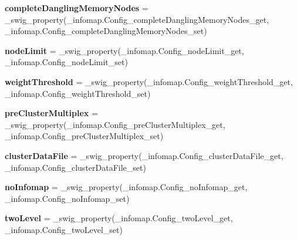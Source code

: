 \begin{DoxyCompactItemize}
\item 
\mbox{\label{classinfomap_1_1Config_a32dbd662fbf0eb3303bb3212ff23edd2}} 
{\bfseries complete\+Dangling\+Memory\+Nodes} = \+\_\+swig\+\_\+property(\+\_\+infomap.\+Config\+\_\+complete\+Dangling\+Memory\+Nodes\+\_\+get, \+\_\+infomap.\+Config\+\_\+complete\+Dangling\+Memory\+Nodes\+\_\+set)
\item 
\mbox{\label{classinfomap_1_1Config_acb667efe63380c616ba19148dff6f3b7}} 
{\bfseries node\+Limit} = \+\_\+swig\+\_\+property(\+\_\+infomap.\+Config\+\_\+node\+Limit\+\_\+get, \+\_\+infomap.\+Config\+\_\+node\+Limit\+\_\+set)
\item 
\mbox{\label{classinfomap_1_1Config_acef3e6ea08f6001e64fd64806101e658}} 
{\bfseries weight\+Threshold} = \+\_\+swig\+\_\+property(\+\_\+infomap.\+Config\+\_\+weight\+Threshold\+\_\+get, \+\_\+infomap.\+Config\+\_\+weight\+Threshold\+\_\+set)
\item 
\mbox{\label{classinfomap_1_1Config_a865a30755fb0f8211daf24fa32ede6c3}} 
{\bfseries pre\+Cluster\+Multiplex} = \+\_\+swig\+\_\+property(\+\_\+infomap.\+Config\+\_\+pre\+Cluster\+Multiplex\+\_\+get, \+\_\+infomap.\+Config\+\_\+pre\+Cluster\+Multiplex\+\_\+set)
\item 
\mbox{\label{classinfomap_1_1Config_a58cb7900b9c91b765cbe988d94cb6f79}} 
{\bfseries cluster\+Data\+File} = \+\_\+swig\+\_\+property(\+\_\+infomap.\+Config\+\_\+cluster\+Data\+File\+\_\+get, \+\_\+infomap.\+Config\+\_\+cluster\+Data\+File\+\_\+set)
\item 
\mbox{\label{classinfomap_1_1Config_a904fe713c6d817963316506a7098ce1d}} 
{\bfseries no\+Infomap} = \+\_\+swig\+\_\+property(\+\_\+infomap.\+Config\+\_\+no\+Infomap\+\_\+get, \+\_\+infomap.\+Config\+\_\+no\+Infomap\+\_\+set)
\item 
\mbox{\label{classinfomap_1_1Config_a2687ab19471d9219ecd06347433a27bc}} 
{\bfseries two\+Level} = \+\_\+swig\+\_\+property(\+\_\+infomap.\+Config\+\_\+two\+Level\+\_\+get, \+\_\+infomap.\+Config\+\_\+two\+Level\+\_\+set)
\item 
\mbox{\label{classinfomap_1_1Config_acde505d826f12943e9ef6ed59ca80784}} 

\end{DoxyCompactItemize}
